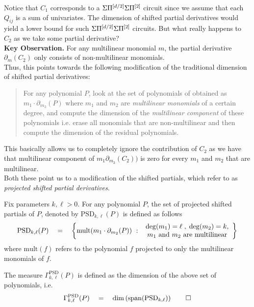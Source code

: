 Notice that $C_1$ corresponds to a $\Sigma\Pi^{[d/2]}\Sigma\Pi^{[2]}$ circuit since we assume that each $Q_{ij}$ is a sum of univariates. 
The dimension of shifted partial derivatives would yield a lower bound for such $\Sigma\Pi^{[d/2]}\Sigma\Pi^{[2]}$ circuits. 
But what really happens to $C_2$ as we take some partial derivative?\\

{\bf Key Observation. } For any multilinear monomial $m$, the partial derivative $\partial_m(C_2)$ only consists of non-multilinear monomials. \\

Thus, this points towards the following modification of the traditional dimension of shifted partial derivatives: 
\begin{quote}
  For any polynomial $P$, look at the set of polynomials of obtained as $m_1 \cdot \partial_{m_2}(P)$ where $m_1$ and $m_2$ are \emph{multilinear monomials} of a certain degree, and compute the dimension of the \emph{multilinear component} of these polynomials i.e. erase all monomials that are non-multilinear and then compute the dimension of the residual polynomials. 
\end{quote}
This basically allows us to completely ignore the contribution of $C_2$ as we have that multilinear component of $m_1 \partial_{m_2}(C_2))$ is zero for every $m_1$ and $m_2$ that are multilinear. \\


Both these point us to a modification of the shifted partials, which \cite{KLSS,KS14} refer to as \emph{projected shifted partial derivatives}. 

\begin{definition}\label{defn:PSPD}
Fix parameters $k,\ell > 0$. 
For any polynomial $P$, the set of projected shifted partials of $P$, denoted by $\mathrm{PSD}_{k,\ell}(P)$ is defined as follows
\[
\mathrm{PSD}_{k,\ell}(P) \quad = \quad \left\{{\mathrm{mult}(m_1 \cdot \partial_{m_2}(P))}\ : \ {\begin{array}{c}\deg(m_1) = \ell\;,\; \deg(m_2) = k,\\ \text{$m_1$ and $m_2$ are multilinear}\end{array}}\right\}
\]
where $\mathrm{mult}(f)$ refers to the polynomial $f$ projected to only the multilinear monomials of $f$. 

The measure $\Gamma^{\mathrm{PSD}}_{k,\ell}(P)$ is defined as the dimension of the above set of polynomials, i.e.
\[\Gamma^{\mathrm{PSD}}_{k,\ell}(P) \quad = \quad \dim\left(\mathrm{span}(\mathrm{PSD}_{k,\ell})\right)\qedhere\]
\end{definition}

